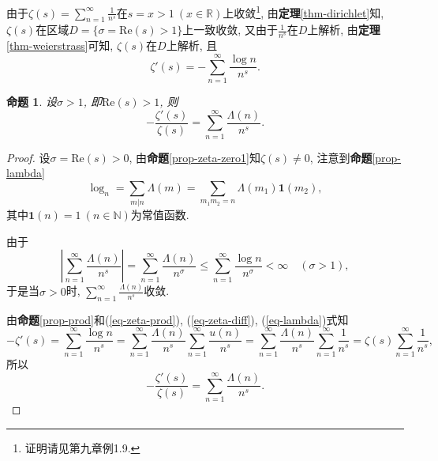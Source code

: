 \documentclass[12pt, a4paper, oneside]{ctexart}
\newtheorem{proposition}{命题}[section]
\numberwithin{equation}{section}  %
\let\leq=\leqslant %
\def\R{\mathbb{R}}          %
\def\N{\mathbb{N}}          %
\def\re{\mathrm{Re}}        %
\begin{document}
由于$\zeta(s)=\sum_{n=1}^\infty\frac{1}{n^s}$在$s = x > 1\ (x\in \R)$上收敛\footnote{证明请见\cite{ref-数分}第九章例1.9.}, 由\textbf{定理}\ref{thm-dirichlet}知, $\zeta(s)$在区域$D = \{\sigma = \re(s) >1\}$上一致收敛, 又由于$\frac{1}{n^s}$在$D$上解析, 由\textbf{定理}\ref{thm-weierstrass}可知, $\zeta(s)$在$D$上解析, 且
\begin{equation}\label{eq-zeta-diff}
    \zeta'(s) = -\sum_{n=1}^\infty\frac{\log n}{n^s}.
\end{equation}
\begin{proposition}\label{prop-zeta-lambda}
    设$\sigma > 1$, 即$\re(s) > 1$, 则
    \begin{equation*}
        -\frac{\zeta'(s)}{\zeta(s)}=\sum_{n=1}^\infty\frac{\Lambda(n)}{n^s}.
    \end{equation*}
\end{proposition}
\begin{proof}
    设$\sigma = \re(s) > 0$, 由\textbf{命题}\ref{prop-zeta-zero1}知$\zeta(s)\neq 0$, 注意到\textbf{命题}\ref{prop-lambda}
    \begin{equation}\label{eq-lambda}
    \log_n = \sum_{m|n}\Lambda(m) = \sum_{m_1m_2 = n}\Lambda(m_1)\mathbf{1}(m_2),
    \end{equation}
    其中$\mathbf{1}(n) = 1\ (n\in\N)$为常值函数.
    
    由于
    \begin{equation*}
        \left|\sum_{n=1}^\infty\frac{\Lambda(n)}{n^s}\right|=\sum_{n=1}^\infty\frac{\Lambda(n)}{n^{\sigma}}\leq\sum_{n=1}^\infty\frac{\log n}{n^\sigma} < \infty\quad(\sigma > 1),
    \end{equation*}
    于是当$\sigma > 0$时, $\sum_{n=1}^\infty\frac{\Lambda(n)}{n^s}$收敛.

    由\textbf{命题}\ref{prop-prod}和(\ref{eq-zeta-prod}), (\ref{eq-zeta-diff}), (\ref{eq-lambda})式知
    \begin{equation*}
        -\zeta'(s) = \sum_{n=1}^\infty\frac{\log n}{n^s} = \sum_{n=1}^\infty\frac{\Lambda(n)}{n^s}\sum_{n=1}^\infty\frac{u(n)}{n^s} = \sum_{n=1}^\infty\frac{\Lambda(n)}{n^s}\sum_{n=1}^\infty\frac{1}{n^s} = \zeta(s)\sum_{n=1}^\infty\frac{1}{n^s},
    \end{equation*}
    所以
    \begin{equation*}
        -\frac{\zeta'(s)}{\zeta(s)}=\sum_{n=1}^\infty\frac{\Lambda(n)}{n^s}.
    \end{equation*}
\end{proof}
\end{document}
